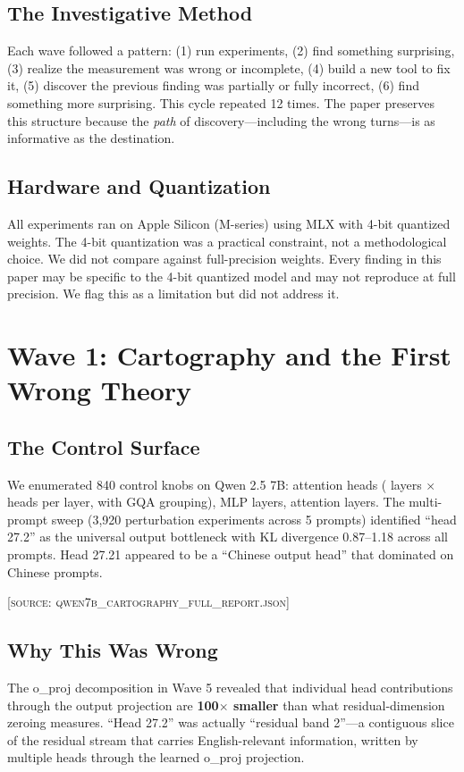 \documentclass[11pt,a4paper]{article}
\begin{document}
\subsection{The Investigative Method}
Each wave followed a pattern: (1) run experiments, (2) find something surprising, (3) realize the measurement was wrong or incomplete, (4) build a new tool to fix it, (5) discover the previous finding was partially or fully incorrect, (6) find something more surprising. This cycle repeated 12 times. The paper preserves this structure because the \textit{path} of discovery---including the wrong turns---is as informative as the destination.

\subsection{Hardware and Quantization}
All experiments ran on Apple Silicon (M-series) using MLX with 4-bit quantized weights. The 4-bit quantization was a practical constraint, not a methodological choice. We did not compare against full-precision weights. Every finding in this paper may be specific to the 4-bit quantized model and may not reproduce at full precision. We flag this as a limitation but did not address it.

\section{Wave 1: Cartography and the First Wrong Theory}

\subsection{The Control Surface}
We enumerated 840 control knobs on Qwen 2.5 7B: \dbNHeads{} attention heads (\dbNLayers{} layers $\times$ \dbNHeadsPerLayer{} heads per layer, with GQA grouping), \dbNLayers{} MLP layers, \dbNLayers{} attention layers. The multi-prompt sweep (3,920 perturbation experiments across 5 prompts) identified ``head 27.2'' as the universal output bottleneck with KL divergence 0.87--1.18 across all prompts. Head 27.21 appeared to be a ``Chinese output head'' that dominated on Chinese prompts.

\textsc{[source: qwen7b\_cartography\_full\_report.json]}

\subsection{Why This Was Wrong}
The o\_proj decomposition in Wave 5 revealed that individual head contributions through the output projection are \textbf{100$\times$ smaller} than what residual-dimension zeroing measures. ``Head 27.2'' was actually ``residual band 2''---a contiguous slice of the residual stream that carries English-relevant information, written by multiple heads through the learned o\_proj projection.
\end{document}

